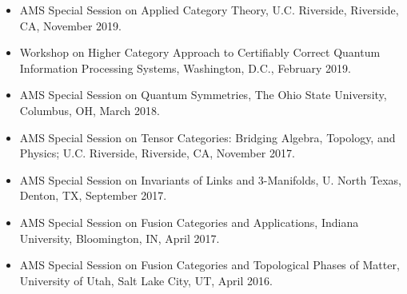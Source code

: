 \documentclass[11pt]{article}
\begin{document}
  \begin{itemize}
    \item[] AMS Special Session on Applied Category Theory, U.C. Riverside, Riverside, CA, November 2019.
    
    \item[] Workshop on Higher Category Approach to Certifiably Correct Quantum Information Processing Systems, Washington, D.C., February 2019.
    
    \item[] AMS Special Session on Quantum Symmetries, The Ohio State University, Columbus, OH, March 2018.
    
    \item[] AMS Special Session on Tensor Categories: Bridging Algebra, Topology, and Physics; U.C. Riverside, Riverside, CA, November 2017.

    \item[] AMS Special Session on Invariants of Links and 3-Manifolds, U. North Texas, Denton, TX, September 2017.

    \item[] AMS Special Session on Fusion Categories and Applications, Indiana University, Bloomington, IN, April 2017.

    \item[] AMS Special Session on Fusion Categories and Topological Phases of Matter, University of Utah, Salt Lake City, UT, April 2016.
  \end{itemize}
  
\end{document}
